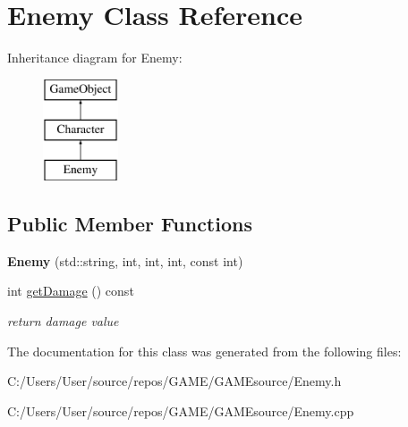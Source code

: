 \hypertarget{class_enemy}{}\section{Enemy Class Reference}
\label{class_enemy}
Inheritance diagram for Enemy\+:\begin{figure}[H]
\begin{center}
\leavevmode
\includegraphics[height=3.000000cm]{class_enemy}
\end{center}
\end{figure}
\subsection*{Public Member Functions}
\begin{DoxyCompactItemize}
\item 
\mbox{\label{class_enemy_af847b3e65f5845b7894bc514ca47174b}} 
{\bfseries Enemy} (std\+::string, int, int, int, const int)
\item 
\mbox{\label{class_enemy_abb68708af5f493bee8516d1dce35797e}} 
int \mbox{\hyperlink{class_enemy_abb68708af5f493bee8516d1dce35797e}{get\+Damage}} () const
\begin{DoxyCompactList}\small\item\em return damage value \end{DoxyCompactList}\end{DoxyCompactItemize}


The documentation for this class was generated from the following files\+:\begin{DoxyCompactItemize}
\item 
C\+:/\+Users/\+User/source/repos/\+G\+A\+M\+E/\+G\+A\+M\+Esource/Enemy.\+h\item 
C\+:/\+Users/\+User/source/repos/\+G\+A\+M\+E/\+G\+A\+M\+Esource/Enemy.\+cpp\end{DoxyCompactItemize}
